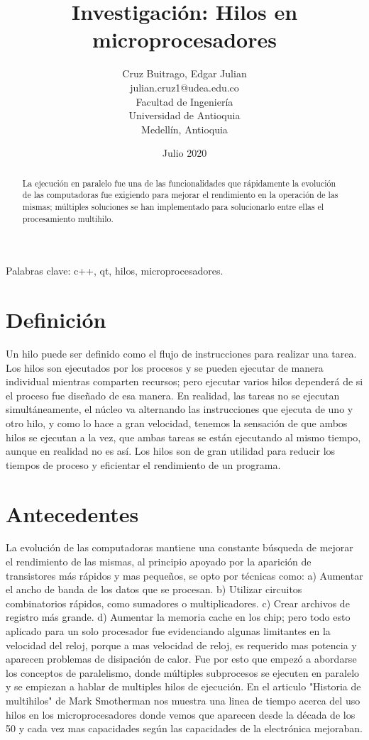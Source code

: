 \documentclass[]{article}
\title{Investigación: Hilos en microprocesadores}
\author{Cruz Buitrago, Edgar Julian \\ julian.cruz1@udea.edu.co \\ Facultad de Ingeniería \\ Universidad de Antioquia \\ Medellín, Antioquia}
\date{Julio 2020}
\begin{document}
	
	\maketitle
	\begin{multicols}{2}
		\justify
		\begin{abstract}		
			La ejecución en paralelo fue una de las funcionalidades que rápidamente la evolución de las computadoras fue exigiendo para mejorar el rendimiento en la operación de las mismas; múltiples soluciones se han implementado para solucionarlo entre ellas el procesamiento multihilo.
		\end{abstract}
		{\smallskip \keywords Palabras clave: c++, qt, hilos, microprocesadores.}
		\section{Definición}
		Un hilo puede ser definido como el flujo de instrucciones para realizar una tarea.\cite{jesgargardon}  Los hilos son ejecutados por los procesos y se pueden ejecutar de manera individual mientras comparten recursos; pero ejecutar varios hilos dependerá de si el proceso fue diseñado de esa manera. En realidad, las tareas no se ejecutan simultáneamente, el núcleo va alternando las instrucciones que ejecuta de uno y otro hilo, y como lo hace a gran velocidad, tenemos la sensación de que ambos hilos se ejecutan a la vez, que ambas tareas se están ejecutando al mismo tiempo, aunque en realidad no es así.\cite{whatsabyte} Los hilos son de gran utilidad para reducir los tiempos de proceso y eficientar el rendimiento de un programa.
		\section{Antecedentes}
		La evolución de las computadoras mantiene una constante búsqueda de mejorar el rendimiento de las mismas, al principio apoyado por la aparición de transistores más rápidos y mas pequeños, se opto por técnicas como: a) Aumentar el ancho de banda de los datos que se procesan. b) Utilizar circuitos combinatorios rápidos, como sumadores o multiplicadores. c) Crear archivos de registro más grande. d) Aumentar la memoria cache en los chip; pero todo esto aplicado para un solo procesador fue evidenciando algunas limitantes en la velocidad del reloj, porque a mas velocidad de reloj, es requerido mas potencia y aparecen problemas de disipación de calor. Fue por esto que empezó a abordarse los conceptos de paralelismo, donde múltiples subprocesos se ejecuten en paralelo y se empiezan a hablar de multiples hilos de ejecución. \cite{history2} En el articulo "Historia de multihilos" de Mark Smotherman\cite{history1} nos muestra una linea de tiempo acerca del uso hilos en los microprocesadores donde vemos que aparecen desde la década de los 50 y cada vez mas capacidades según las capacidades de la electrónica mejoraban. 

\end{multicols}
\end{document}
